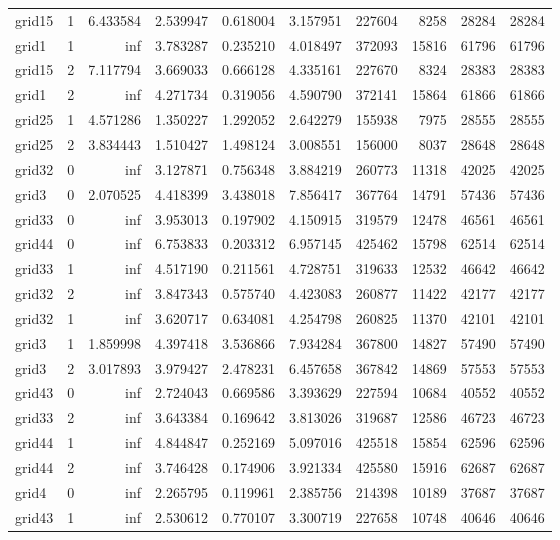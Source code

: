 \begin{longtable}{|l|r|r|r|r|r|r|r|r|r|}
grid15 & 1 & 6.433584 & 2.539947 & 0.618004 & 3.157951 & 227604 & 8258 & 28284 & 28284 \\
grid1 & 1 & inf & 3.783287 & 0.235210 & 4.018497 & 372093 & 15816 & 61796 & 61796 \\
grid15 & 2 & 7.117794 & 3.669033 & 0.666128 & 4.335161 & 227670 & 8324 & 28383 & 28383 \\
grid1 & 2 & inf & 4.271734 & 0.319056 & 4.590790 & 372141 & 15864 & 61866 & 61866 \\
grid25 & 1 & 4.571286 & 1.350227 & 1.292052 & 2.642279 & 155938 & 7975 & 28555 & 28555 \\
grid25 & 2 & 3.834443 & 1.510427 & 1.498124 & 3.008551 & 156000 & 8037 & 28648 & 28648 \\
grid32 & 0 & inf & 3.127871 & 0.756348 & 3.884219 & 260773 & 11318 & 42025 & 42025 \\
grid3 & 0 & 2.070525 & 4.418399 & 3.438018 & 7.856417 & 367764 & 14791 & 57436 & 57436 \\
grid33 & 0 & inf & 3.953013 & 0.197902 & 4.150915 & 319579 & 12478 & 46561 & 46561 \\
grid44 & 0 & inf & 6.753833 & 0.203312 & 6.957145 & 425462 & 15798 & 62514 & 62514 \\
grid33 & 1 & inf & 4.517190 & 0.211561 & 4.728751 & 319633 & 12532 & 46642 & 46642 \\
grid32 & 2 & inf & 3.847343 & 0.575740 & 4.423083 & 260877 & 11422 & 42177 & 42177 \\
grid32 & 1 & inf & 3.620717 & 0.634081 & 4.254798 & 260825 & 11370 & 42101 & 42101 \\
grid3 & 1 & 1.859998 & 4.397418 & 3.536866 & 7.934284 & 367800 & 14827 & 57490 & 57490 \\
grid3 & 2 & 3.017893 & 3.979427 & 2.478231 & 6.457658 & 367842 & 14869 & 57553 & 57553 \\
grid43 & 0 & inf & 2.724043 & 0.669586 & 3.393629 & 227594 & 10684 & 40552 & 40552 \\
grid33 & 2 & inf & 3.643384 & 0.169642 & 3.813026 & 319687 & 12586 & 46723 & 46723 \\
grid44 & 1 & inf & 4.844847 & 0.252169 & 5.097016 & 425518 & 15854 & 62596 & 62596 \\
grid44 & 2 & inf & 3.746428 & 0.174906 & 3.921334 & 425580 & 15916 & 62687 & 62687 \\
grid4 & 0 & inf & 2.265795 & 0.119961 & 2.385756 & 214398 & 10189 & 37687 & 37687 \\
grid43 & 1 & inf & 2.530612 & 0.770107 & 3.300719 & 227658 & 10748 & 40646 & 40646 \\

\end{longtable}
